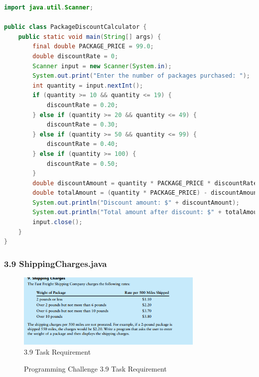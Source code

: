 \documentclass{article}
\begin{document}
\begin{lstlisting}[language=Java, caption=PackageDiscountCalculator.java]
import java.util.Scanner;

public class PackageDiscountCalculator {
    public static void main(String[] args) {
        final double PACKAGE_PRICE = 99.0;
        double discountRate = 0;
        Scanner input = new Scanner(System.in);
        System.out.print("Enter the number of packages purchased: ");
        int quantity = input.nextInt();
        if (quantity >= 10 && quantity <= 19) {
            discountRate = 0.20;
        } else if (quantity >= 20 && quantity <= 49) {
            discountRate = 0.30;
        } else if (quantity >= 50 && quantity <= 99) {
            discountRate = 0.40;
        } else if (quantity >= 100) {
            discountRate = 0.50;
        }
        double discountAmount = quantity * PACKAGE_PRICE * discountRate;
        double totalAmount = (quantity * PACKAGE_PRICE) - discountAmount;
        System.out.println("Discount amount: $" + discountAmount);
        System.out.println("Total amount after discount: $" + totalAmount);
        input.close();
    }
}
\end{lstlisting}

\subsubsection*{3.9 ShippingCharges.java}
\begin{figure}[H]
    \centering
    \includegraphics[width=0.8\textwidth]{./Assets/Task requirements/Assignment3/3.9.png}
    \caption{ 3.9 Task Requirement}
\end{figure}
\begin{figure}[h]
    \centering
    \caption{Programming Challenge 3.9 Task Requirement}
\end{figure}
\end{document}
